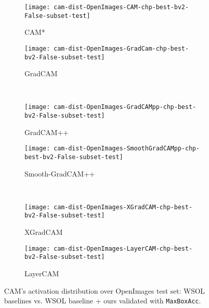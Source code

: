 \documentclass[twocolumn]{article}
\newcommand\maxboxacc{\texttt{MaxBoxAcc}\xspace}
\theoremstyle{definition}
\begin{document}
\begin{figure*}
     \centering
     \begin{subfigure}[b]{0.49\textwidth}
         \centering
         \texttt{[image: cam-dist-OpenImages-CAM-chp-best-bv2-False-subset-test]}
         \caption{CAM*}
         \label{fig:dist6oim}
     \end{subfigure}
     \hfill
     \begin{subfigure}[b]{0.49\textwidth}
         \centering
         \texttt{[image: cam-dist-OpenImages-GradCam-chp-best-bv2-False-subset-test]}
         \caption{GradCAM}
         \label{fig:dist5oim}
     \end{subfigure}
     \\
     \begin{subfigure}[b]{0.49\textwidth}
         \centering
         \texttt{[image: cam-dist-OpenImages-GradCAMpp-chp-best-bv2-False-subset-test]}
         \caption{GradCAM++}
         \label{fig:dist4oim}
     \end{subfigure}
     \begin{subfigure}[b]{0.49\textwidth}
         \centering
         \texttt{[image: cam-dist-OpenImages-SmoothGradCAMpp-chp-best-bv2-False-subset-test]}
         \caption{Smooth-GradCAM++}
         \label{fig:dis3oim}
     \end{subfigure}
     \\
     \begin{subfigure}[b]{0.49\textwidth}
         \centering
         \texttt{[image: cam-dist-OpenImages-XGradCAM-chp-best-bv2-False-subset-test]}
         \caption{XGradCAM}
         \label{fig:dist2oim}
     \end{subfigure}
     \hfill
     \begin{subfigure}[b]{0.49\textwidth}
         \centering
         \texttt{[image: cam-dist-OpenImages-LayerCAM-chp-best-bv2-False-subset-test]}
         \caption{LayerCAM}
         \label{fig:dist1oim}
     \end{subfigure}
        \caption{CAM's activation distribution over OpenImages test set: WSOL baselines vs. WSOL baseline + ours  validated with \maxboxacc.}
        \label{fig:openimages-cam-dist}
\end{figure*}
\end{document}
